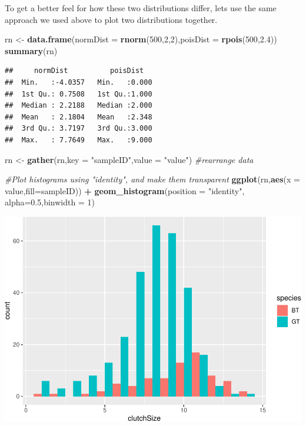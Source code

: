 \documentclass[
  a4paperpaper,
]{book}
\newenvironment{Shaded}{\begin{snugshade}}{\end{snugshade}}
\newcommand{\CommentTok}[1]{\textcolor[rgb]{0.56,0.35,0.01}{\textit{#1}}}
\newcommand{\DataTypeTok}[1]{\textcolor[rgb]{0.13,0.29,0.53}{#1}}
\newcommand{\DecValTok}[1]{\textcolor[rgb]{0.00,0.00,0.81}{#1}}
\newcommand{\FloatTok}[1]{\textcolor[rgb]{0.00,0.00,0.81}{#1}}
\newcommand{\KeywordTok}[1]{\textcolor[rgb]{0.13,0.29,0.53}{\textbf{#1}}}
\newcommand{\NormalTok}[1]{#1}
\newcommand{\OperatorTok}[1]{\textcolor[rgb]{0.81,0.36,0.00}{\textbf{#1}}}
\newcommand{\StringTok}[1]{\textcolor[rgb]{0.31,0.60,0.02}{#1}}
\begin{document}
To get a better feel for how these two distributions differ, lets use the same approach we used above to plot two distributions together.

\begin{Shaded}
\begin{Highlighting}[]
\NormalTok{rn \textless{}{-}}\StringTok{ }\KeywordTok{data.frame}\NormalTok{(}\DataTypeTok{normDist =} \KeywordTok{rnorm}\NormalTok{(}\DecValTok{500}\NormalTok{,}\DecValTok{2}\NormalTok{,}\DecValTok{2}\NormalTok{),}\DataTypeTok{poisDist =} \KeywordTok{rpois}\NormalTok{(}\DecValTok{500}\NormalTok{,}\FloatTok{2.4}\NormalTok{))}
\KeywordTok{summary}\NormalTok{(rn)}
\end{Highlighting}
\end{Shaded}

\begin{verbatim}
##     normDist          poisDist    
##  Min.   :-4.0357   Min.   :0.000  
##  1st Qu.: 0.7508   1st Qu.:1.000  
##  Median : 2.2188   Median :2.000  
##  Mean   : 2.1804   Mean   :2.348  
##  3rd Qu.: 3.7197   3rd Qu.:3.000  
##  Max.   : 7.7649   Max.   :9.000
\end{verbatim}

\begin{Shaded}
\begin{Highlighting}[]
\NormalTok{rn \textless{}{-}}\StringTok{ }\KeywordTok{gather}\NormalTok{(rn,}\DataTypeTok{key =} \StringTok{"sampleID"}\NormalTok{,}\DataTypeTok{value =} \StringTok{"value"}\NormalTok{) }\CommentTok{\#rearrange data}

\CommentTok{\#Plot histograms using "identity", and make them transparent}
\KeywordTok{ggplot}\NormalTok{(rn,}\KeywordTok{aes}\NormalTok{(}\DataTypeTok{x =}\NormalTok{ value,}\DataTypeTok{fill=}\NormalTok{sampleID)) }\OperatorTok{+}
\StringTok{  }\KeywordTok{geom\_histogram}\NormalTok{(}\DataTypeTok{position =} \StringTok{"identity"}\NormalTok{, }\DataTypeTok{alpha=}\FloatTok{0.5}\NormalTok{,}\DataTypeTok{binwidth =} \DecValTok{1}\NormalTok{)}
\end{Highlighting}
\end{Shaded}

\begin{center}\includegraphics{BB852_files/figure-latex/unnamed-chunk-105-1} \end{center}
\end{document}
